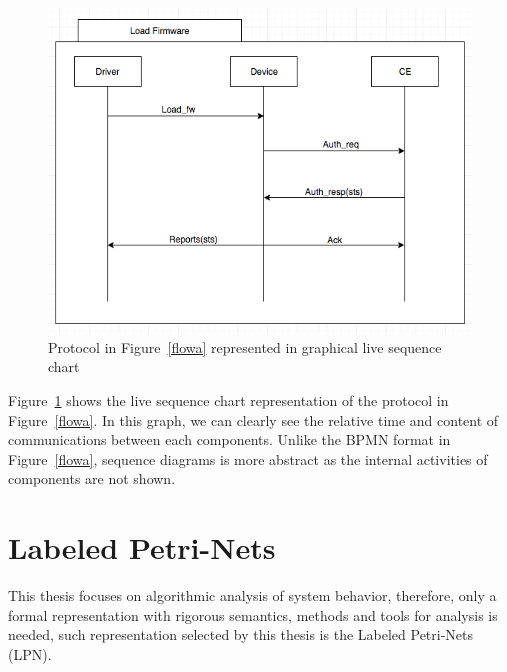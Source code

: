 \documentclass[12pt,frontmatter,copyright,thesis]{usfmanus}
\begin{document}
\begin{figure} [h]
\centerline{
\includegraphics[width=5in]{livesc.png}}
\caption{Protocol in Figure~\ref{flowa} represented in graphical live sequence chart }
\label{livesequence}
\end{figure}
 Figure~\ref{livesequence} shows the live sequence chart representation of the protocol in Figure~\ref{flowa}.
In this graph, we can clearly see the relative time and content of communications between each
components. Unlike the BPMN format in Figure~\ref{flowa}, sequence diagrams is more abstract
as the internal activities of components are not shown.
  
  
  
\section{Labeled Petri-Nets} \label{petri}
This thesis focuses on algorithmic analysis of system behavior, therefore,
only a formal representation with rigorous
semantics, methods and tools for analysis is needed, such
representation selected by this thesis is the Labeled Petri-Nets (LPN).
\end{document}
